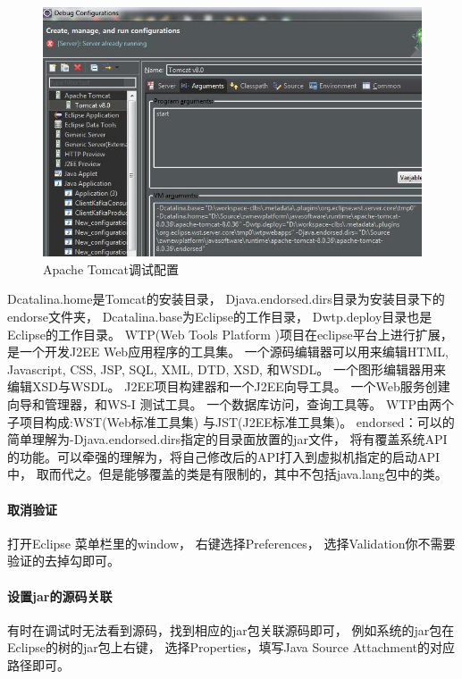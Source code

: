 \documentclass{book}
\begin{document}
\begin{figure}[htbp]
	\centering
	\includegraphics[scale=0.5]{ApacheTomcatDebugConfiguration.jpg}
	\caption{Apache Tomcat调试配置}
	\label{code:ApacheTomcatDebugConfiguration}
\end{figure}

Dcatalina.home是Tomcat的安装目录，
Djava.endorsed.dirs目录为安装目录下的endorse文件夹，
Dcatalina.base为Eclipse的工作目录，
Dwtp.deploy目录也是Eclipse的工作目录。
WTP(Web Tools Platform )项目在eclipse平台上进行扩展，是一个开发J2EE Web应用程序的工具集。
一个源码编辑器可以用来编辑HTML, Javascript, CSS, JSP, SQL, XML, DTD, XSD, 和WSDL。
一个图形编辑器用来编辑XSD与WSDL。
J2EE项目构建器和一个J2EE向导工具。
一个Web服务创建向导和管理器，和WS-I 测试工具。
一个数据库访问，查询工具等。
WTP由两个子项目构成:WST(Web标准工具集) 与JST(J2EE标准工具集)。
endorsed：可以的简单理解为-Djava.endorsed.dirs指定的目录面放置的jar文件，
将有覆盖系统API的功能。可以牵强的理解为，将自己修改后的API打入到虚拟机指定的启动API中，
取而代之。但是能够覆盖的类是有限制的，其中不包括java.lang包中的类。

\paragraph{取消验证}

打开Eclipse 菜单栏里的window，
右键选择Preferences，
选择Validation你不需要验证的去掉勾即可。

\paragraph{设置jar的源码关联}

有时在调试时无法看到源码，找到相应的jar包关联源码即可，
例如系统的jar包在Eclipse的树的jar包上右键，
选择Properties，填写Java Source Attachment的对应路径即可。
\end{document}
